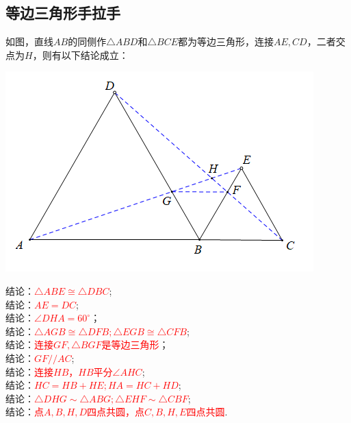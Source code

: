 \subsection{等边三角形手拉手}
如图，直线$AB$的同侧作$\triangle ABD$和$\triangle BCE$都为等边三角形，连接$AE,CD$，二者交点为$H$，则有以下结论成立：

\begin{minipage}{0.4\textwidth}
	\includegraphics[scale=0.6]{figure/shoulashou03}
\end{minipage}
\begin{minipage}{0.6\textwidth}
 结论：\textcolor{red}{$\triangle ABE\cong \triangle DBC$};\\
结论：\textcolor{red}{$AE=DC$};\\
结论：\textcolor{red}{$\angle DHA=60^\circ$}；\\
结论：\textcolor{red}{$\triangle AGB\cong \triangle DFB;\triangle EGB\cong \triangle CFB$};\\
结论：\textcolor{red}{连接$GF,\triangle BGF$是等边三角形}；\\
结论：\textcolor{red}{$GF//AC$};\\
结论：\textcolor{red}{连接$HB$，$HB$平分$\angle AHC$};\\
结论：\textcolor{red}{$HC=HB+HE;HA=HC+HD$};\\
结论：\textcolor{red}{$\triangle DHG\sim \triangle ABG;\triangle EHF\sim \triangle CBF$};\\
结论：\textcolor{red}{点$A,B,H,D$四点共圆，点$C,B,H,E$四点共圆}.
\end{minipage}
